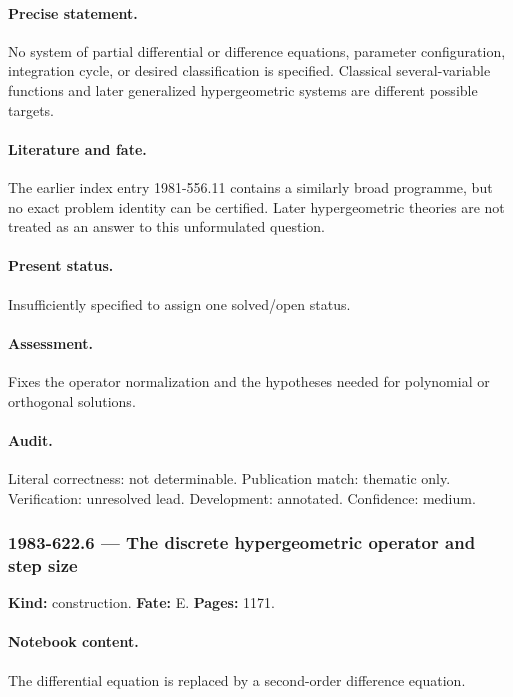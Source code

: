 \paragraph{Precise statement.} No system of partial differential or difference equations, parameter configuration, integration cycle, or desired classification is specified. Classical several-variable functions and later generalized hypergeometric systems are different possible targets.

\paragraph{Literature and fate.} The earlier index entry 1981-556.11 contains a similarly broad programme, but no exact problem identity can be certified. Later hypergeometric theories are not treated as an answer to this unformulated question.

\paragraph{Present status.} Insufficiently specified to assign one solved/open status.

\paragraph{Assessment.} Fixes the operator normalization and the hypotheses needed for polynomial or orthogonal solutions.

\paragraph{Audit.} Literal correctness: not determinable. Publication match: thematic only. Verification: unresolved lead. Development: annotated. Confidence: medium.

\subsubsection{1983-622.6 --- The discrete hypergeometric operator and step size}

\label{item:1983-622.6}

\noindent\textbf{Kind:} construction. \textbf{Fate:} E. \textbf{Pages:} 1171.\par

\paragraph{Notebook content.} The differential equation is replaced by a second-order difference equation.

